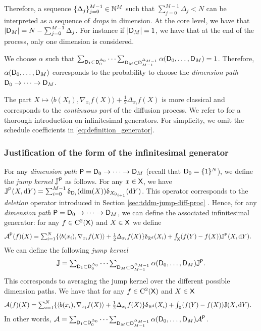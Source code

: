 Therefore, a sequence $\{\Delta_j\}_{j=0}^{M-1} \in \mathbb{N}^{M}$ such that
$\sum_{j=0}^{M-1} \Delta_j < N$ can be interpreted as a sequence of
\emph{drops} in dimension. At the core level, we have that
$|\mathsf{D}_M| = N - \sum_{j=0}^{M-1} \Delta_j$. For instance if
$|\mathsf{D}_M| = 1$, we have that at the end of the process, only one dimension
is considered.

We choose $\alpha$ such that
$\sum_{\mathsf{D}_1 \subset \mathsf{D}_0^{\Delta_0}} \dots \sum_{\mathsf{D}_M \subset
  \mathsf{D}_{M-1}^{\Delta_{M-1}}} \alpha(\mathsf{D}_0, \dots, \mathsf{D}_M) = 1$. Therefore,
$\alpha(\mathsf{D}_0, \dots, \mathsf{D}_M)$ corresponds to the probability to choose the
\emph{dimension path} $\mathsf{D}_0 \to \dots \to \mathsf{D}_M$.

The part
$X \mapsto \langle b(X_i), \nabla_{x_i}f(X) \rangle + \tfrac{1}{2} \Delta_{x_i}f(X)$ is
more classical and corresponds to the \emph{continuous part} of the diffusion
process. We refer to \citet{ethier2009markov} for a thorough introduction on
infinitesimal generators. For simplicity, we omit the schedule coefficients in
\eqref{eq:definition_generator}.

\subsubsection{Justification of the form of the infinitesimal generator}
\label{sec:tddm-just-form-infin}

For any \emph{dimension path} $\mathsf{P} = \mathsf{D}_0 \to \dots \to \mathsf{D}_M$ (recall that
$\mathsf{D}_0 = \{1\}^N$), we define the \emph{jump kernel} $\mathbb{J}^{\mathsf{P}}$ as
follows. For any $x \in \mathsf{X}$, we have
$\mathbb{J}^{\mathsf{P}}(X, \mathrm{d} Y) = \sum_{i=0}^{M-1} \updelta_{\mathsf{D}_i}(\mathrm{dim}(X))
\updelta_{X_{\mathsf{D}_{i+1}}}(\mathrm{d} Y)$. This operator corresponds to the \emph{deletion}
operator introduced in Section \ref{sec:tddm-jump-diff-proc} . Hence, for any \emph{dimension
  path} $\mathsf{P} = \mathsf{D}_0 \to \dots \to \mathsf{D}_M$, we can define the associated
infinitesimal generator: for any $f \in \mathrm{C}^2(\mathsf{X})$ and $X \in \mathsf{X}$ we define
\begin{align}
  {\mathcal{A}}^{\mathsf{P}}(f)(X) &\textstyle= \sum_{i=1}^N \{ \langle b(x_i), \nabla_{x_i}f(X) \rangle + \tfrac{1}{2} \Delta_{x_i}f(X)\} \updelta_{\mathbb{R}^d}(X_i) + \int_{\mathsf{X}}(f(Y) - f(X))\mathbb{J}^{\mathsf{P}}(X, \mathrm{d} Y) .
\end{align}
We can define the following \emph{jump kernel}
\begin{equation}
  \textstyle \mathbb{J} = \sum_{\mathsf{D}_1 \subset \mathsf{D}_0^{\Delta_0}} \dots  \sum_{\mathsf{D}_M \subset \mathsf{D}_{M-1}^{\Delta_{M-1}}} \alpha(\mathsf{D}_0, \dots, \mathsf{D}_M) \mathbb{J}^{\mathsf{P}} .
\end{equation}
This corresponds to averaging the jump kernel over the different possible
dimension paths. We have that for any $f \in \mathrm{C}^2(\mathsf{X})$ and $X \in \mathsf{X}$
\begin{align}
  \label{eq:inf_gen_tot}
  {\mathcal{A}}(f)(X) &\textstyle= \sum_{i=1}^N \{ \langle b(x_i), \nabla_{x_i}f(X) \rangle + \tfrac{1}{2} \Delta_{x_i}f(X)\} \updelta_{\mathbb{R}^d}(X_i) + \int_{\mathsf{X}}(f(Y) - f(X))\mathbb{J}(X, \mathrm{d} Y) .
\end{align}
In other words,
${\mathcal{A}} = \sum_{\mathsf{D}_1 \subset \mathsf{D}_0^{\Delta_0}} \dots \sum_{\mathsf{D}_M \subset
  \mathsf{D}_{M-1}^{\Delta_{M-1}}} \alpha(\mathsf{D}_0, \dots, \mathsf{D}_M) {\mathcal{A}}^{\mathsf{P}}$.

